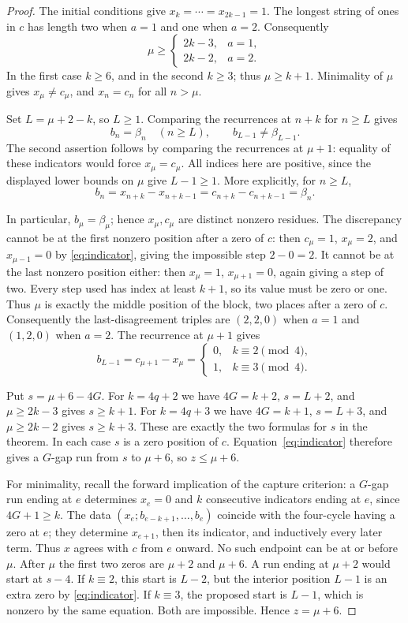\documentclass[11pt]{article}
\begin{document}
\begin{proof}
The initial conditions give $x_k=\cdots=x_{2k-1}=1$. The longest
string of ones in $c$ has length two when $a=1$ and one when $a=2$.
Consequently
\[
\mu\ge\begin{cases}2k-3,&a=1,\\2k-2,&a=2.\end{cases}
\]
In the first case $k\ge6$, and in the second $k\ge3$; thus
$\mu\ge k+1$. Minimality of $\mu$ gives $x_\mu\ne c_\mu$,
and $x_n=c_n$ for all $n>\mu$.

Set $L=\mu+2-k$, so $L\ge1$. Comparing the recurrences at $n+k$
for $n\ge L$ gives
\begin{equation}\label{eq:indicator}
b_n=\beta_n\quad(n\ge L),\qquad b_{L-1}\ne\beta_{L-1}.
\end{equation}
The second assertion follows by comparing the recurrences at
$\mu+1$: equality of these indicators would force
$x_\mu=c_\mu$. All indices here are positive, since the displayed
lower bounds on $\mu$ give $L-1\ge1$.
More explicitly, for $n\ge L$,
\[
b_n=x_{n+k}-x_{n+k-1}=c_{n+k}-c_{n+k-1}=\beta_n.
\]

In particular, $b_\mu=\beta_\mu$; hence $x_\mu,c_\mu$ are distinct
nonzero residues. The discrepancy cannot be at the first nonzero
position after a zero of $c$: then $c_\mu=1$, $x_\mu=2$, and
$x_{\mu-1}=0$ by \eqref{eq:indicator}, giving the impossible step
$2-0=2$. It cannot be at the last nonzero position either: then
$x_\mu=1$, $x_{\mu+1}=0$, again giving a step of two.
Every step used has index at least $k+1$, so its value must be zero
or one. Thus $\mu$ is exactly the middle position of the block,
two places after a zero of $c$.
Consequently the last-disagreement triples are $(2,2,0)$ when
$a=1$ and $(1,2,0)$ when $a=2$. The recurrence at $\mu+1$ gives
\[
b_{L-1}=c_{\mu+1}-x_\mu=
\begin{cases}0,&k\equiv2\pmod4,\\1,&k\equiv3\pmod4.\end{cases}
\]

Put $s=\mu+6-4G$. For $k=4q+2$ we have $4G=k+2$,
$s=L+2$, and $\mu\ge2k-3$ gives $s\ge k+1$.
For $k=4q+3$ we have $4G=k+1$, $s=L+3$, and
$\mu\ge2k-2$ gives $s\ge k+3$. These are exactly the two
formulas for $s$ in the theorem. In each case $s$ is
a zero position of $c$. Equation~\eqref{eq:indicator} therefore
gives a $G$-gap run from $s$ to $\mu+6$, so $z\le\mu+6$.

For minimality, recall the forward implication of the capture
criterion: a $G$-gap run ending at $e$ determines $x_e=0$ and
$k$ consecutive indicators ending at $e$, since $4G+1\ge k$.
The data $(x_e;b_{e-k+1},\ldots,b_e)$ coincide with the
four-cycle having a zero at $e$; they determine $x_{e+1}$,
then its indicator, and inductively every later term. Thus $x$ agrees
with $c$ from $e$ onward. No such endpoint can be at or before
$\mu$. After $\mu$ the first two zeros are $\mu+2$ and $\mu+6$.
A run ending at $\mu+2$ would start at $s-4$. If $k\equiv2$,
this start is $L-2$, but the interior position $L-1$ is an extra
zero by \eqref{eq:indicator}. If $k\equiv3$, the proposed start is
$L-1$, which is nonzero by the same equation. Both are impossible.
Hence $z=\mu+6$.
\end{proof}
\end{document}
